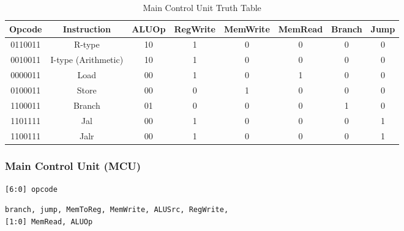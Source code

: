 \documentclass[journal]{IEEEtran}
\begin{document}
\begin{table}[!ht]
  \centering
  \caption{Main Control Unit Truth Table}
  \begin{tabular}{|c|c|c|c|c|c|c|c|}
    \hline
    \textbf{Opcode} & \textbf{Instruction} & \textbf{ALUOp} & \textbf{RegWrite} & \textbf{MemWrite} & \textbf{MemRead} & \textbf{Branch} & \textbf{Jump} \\
    \hline
    0110011         & R-type               & 10             & 1                 & 0                 & 0                & 0               & 0             \\
    0010011         & I-type (Arithmetic)  & 10             & 1                 & 0                 & 0                & 0               & 0             \\
    0000011         & Load                 & 00             & 1                 & 0                 & 1                & 0               & 0             \\
    0100011         & Store                & 00             & 0                 & 1                 & 0                & 0               & 0             \\
    1100011         & Branch               & 01             & 0                 & 0                 & 0                & 1               & 0             \\
    1101111         & Jal                  & 00             & 1                 & 0                 & 0                & 0               & 1             \\
    1100111         & Jalr                 & 00             & 1                 & 0                 & 0                & 0               & 1             \\
    \hline
  \end{tabular}
  \label{table:mcu_truth}
\end{table}

\subsubsection{Main Control Unit (MCU)}

\begin{description}[style=multiline, leftmargin=2cm, font=\bfseries]
  \item[Inputs:] \texttt{[6:0] opcode}
  \item[Outputs:] \texttt{branch, jump, MemToReg, MemWrite, ALUSrc, RegWrite,} \\
        \texttt{[1:0] MemRead, ALUOp}
\end{description}
\end{document}
